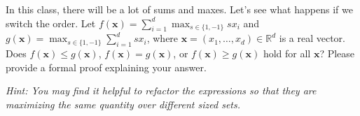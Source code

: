 \item {}

In this class, there will be a lot of sums and maxes. Let's see what happens if
we switch the order. Let
$f(\mathbf x) = \sum_{i=1}^d \max_{s \in \{1,-1\}} s x_i$
and $g(\mathbf x) = \max_{s \in \{1,-1\}} \sum_{i=1}^d s x_i$, where
$\mathbf x = (x_1, \dots, x_d) \in \mathbb{R}^d$ is a real vector. Does $f(\mathbf x) \le g(\mathbf x)$, $f(\mathbf x) = g(\mathbf x)$, or $f(\mathbf x) \ge g(\mathbf x)$ hold for all $\mathbf x$?
Please provide a formal proof explaining your answer.

{\em Hint: You may find it helpful to refactor the expressions so that they
are maximizing the same quantity over different sized sets.}
